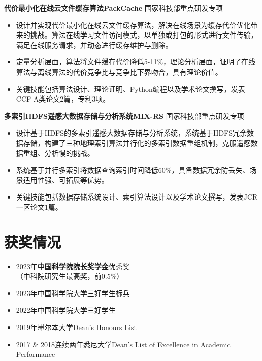 \documentclass[UTF8,letterpaper,11pt]{article}
\begin{document}
\vspace{1pt}

\textbf{代价最小化在线云文件缓存算法PackCache} \hfill 国家科技部重点研发专项

\begin{itemize}
  \setlength\itemsep{2pt}
  \item 设计并实现代价最小化在线云文件缓存算法，解决在线场景为缓存代价优化带来的挑战。算法在线学习文件访问模式，以单独或打包的形式进行文件传输，满足在线服务请求，并动态进行缓存维护与删除。
  \item 定量分析层面，算法将文件缓存代价降低5-11\%，理论分析层面，证明了在线算法与离线算法的代价竞争比与竞争比下界吻合，具有理论价值。
  \item 关键技能包括算法设计、理论证明、Python编程以及学术论文撰写，发表CCF-A类论文2篇，专利3项。
\end{itemize}

\vspace{1pt}

\textbf{多索引HDFS遥感大数据存储与分析系统MIX-RS} \hfill 国家科技部重点研发专项

\begin{itemize}
  \setlength\itemsep{2pt}
  \item 设计基于HDFS的多索引遥感大数据存储与分析系统，系统基于HDFS冗余数据存储，构建了三种地理索引算法并行化的多索引数据重组机制，克服遥感数据重组、分析慢的挑战。
  \item 系统基于并行多索引将数据查询索引时间降低60\%，具备数据冗余防丢失、场景适用性强、可拓展等优势。
  \item 关键技能包括数据存储系统设计、索引算法设计以及学术论文撰写，发表JCR一区论文1篇。
\end{itemize}




\section{\textbf{获奖情况}}
\vspace{-5mm}
\begin{multicols}{2}
\begin{itemize}
  \setlength\itemsep{2pt}
  \item 2023年\textbf{中国科学院院长奖学金}优秀奖\\（中科院研究生最高奖，前0.5\%）
  \item 2023年中国科学院大学三好学生标兵
  \item 2022年中国科学院大学三好学生
  \item 2019年墨尔本大学Dean's Honours List
  \item 2017 \& 2018连续两年悉尼大学Dean's List of Excellence in Academic Performance
\end{itemize}
\end{multicols}
\end{document}
